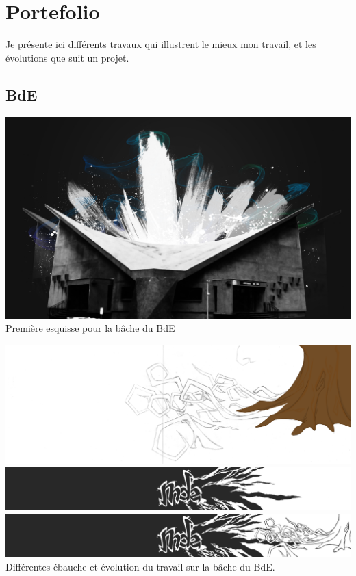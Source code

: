 \newpage

\section{Portefolio}

    Je présente ici différents travaux qui illustrent le mieux mon travail, et les évolutions que suit un projet.
    \subsection{BdE}
        \begin{center}
            \includegraphics[width=\textwidth]{img/amphi.jpg}\\
            Première esquisse pour la bâche du BdE
        \end{center}

        \begin{center}
            \includegraphics[width=\textwidth]{img/arbre.png}
            \includegraphics[width=\textwidth]{img/mde.png}
            \includegraphics[width=\textwidth]{img/mde+arbre.png}
            Différentes ébauche et évolution du travail sur la bâche du BdE.
        \end{center}
            
